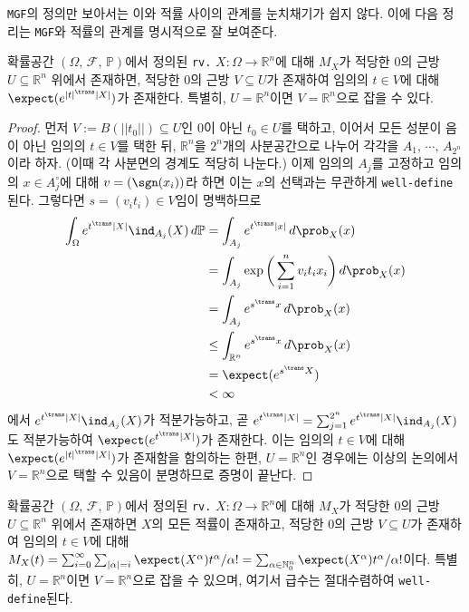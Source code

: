 \texttt{MGF}의 정의만 보아서는 이와 적률 사이의 관계를 눈치채기가 쉽지 않다. 이에 다음 정리는 \texttt{MGF}와 적률의 관계를 명시적으로 잘 보여준다.

\begin{lemma}\label{lem:MGFTaylor}
    확률공간 $(\Omega,\,\mathcal{F},\,\mathbb{P})$에서 정의된 \texttt{rv.} $X:\Omega\to\mathbb{R}^n$에 대해 $M_X$가 적당한 $0$의 근방 $U\subseteq\mathbb{R}^n$ 위에서 존재하면, 적당한 $0$의 근방 $V\subseteq U$가 존재하여 임의의 $t\in V$에 대해 $\expect(e^{|t|^\trans|X|})$가 존재한다. 특별히, $U=\mathbb{R}^n$이면 $V=\mathbb{R}^n$으로 잡을 수 있다.
\end{lemma}

\begin{proof}
    먼저 $V:=B(||t_0||)\subseteq U$인 $0$이 아닌 $t_0\in U$를 택하고, 이어서 모든 성분이 음이 아닌 임의의 $t\in V$를 택한 뒤, $\mathbb{R}^n$을 $2^n$개의 사분공간으로 나누어 각각을 $A_1,\,\cdots,\,A_{2^n}$이라 하자. (이때 각 사분면의 경계도 적당히 나눈다.) 이제 임의의 $A_j$를 고정하고 임의의 $x\in A_j^\circ$에 대해 $v=(\sgn(x_i))$라 하면 이는 $x$의 선택과는 무관하게 \texttt{well-define}된다. 그렇다면 $s=(v_it_i)\in V$임이 명백하므로
    \begin{align*}
        \int_\Omega e^{t^\trans|X|}\ind_{A_j}(X)\,d\mathbb{P}&=\int_{A_j}e^{t^\trans|x|}\,d\prob_X(x)\\
        &=\int_{A_j}\exp\bigg(\sum_{i=1}^nv_it_ix_i\bigg)\,d\prob_X(x)\\
        &=\int_{A_j}e^{s^\trans x}\,d\prob_X(x)\\
        &\leq\int_{\mathbb{R}^n}e^{s^\trans x}\,d\prob_X(x)\\
        &=\expect(e^{s^\trans X})\\
        &<\infty
    \end{align*}
    에서 $e^{t^\trans|X|}\ind_{A_j}(X)$가 적분가능하고, 곧 $e^{t^\trans|X|}=\sum_{j=1}^{2^n}e^{t^\trans|X|}\ind_{A_j}(X)$도 적분가능하여 $\expect(e^{t^\trans|X|})$가 존재한다. 이는 임의의 $t\in V$에 대해 $\expect(e^{|t|^\trans|X|})$가 존재함을 함의하는 한편, $U=\mathbb{R}^n$인 경우에는 이상의 논의에서 $V=\mathbb{R}^n$으로 택할 수 있음이 분명하므로 증명이 끝난다.
\end{proof}

\begin{theorem}\label{thm:MGFTaylor}
    확률공간 $(\Omega,\,\mathcal{F},\,\mathbb{P})$에서 정의된 \texttt{rv.} $X:\Omega\to\mathbb{R}^n$에 대해 $M_X$가 적당한 $0$의 근방 $U\subseteq\mathbb{R}^n$ 위에서 존재하면 $X$의 모든 적률이 존재하고, 적당한 $0$의 근방 $V\subseteq U$가 존재하여 임의의 $t\in V$에 대해 $M_X(t)=\sum_{i=0}^\infty\sum_{|\alpha|=i}\expect(X^\alpha)t^\alpha/\alpha!=\sum_{\alpha\in\mathbb{N}_0^n}\expect(X^\alpha)t^\alpha/\alpha!$이다. 특별히, $U=\mathbb{R}^n$이면 $V=\mathbb{R}^n$으로 잡을 수 있으며, 여기서 급수는 절대수렴하여 \texttt{well-define}된다.
\end{theorem}


